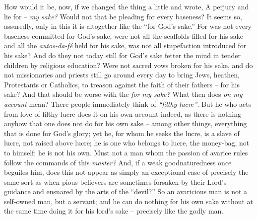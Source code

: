 How would it be, now, if we changed the thing a little and wrote, A perjury 
and lie for -- \textit{my sake?} Would not that be pleading for every 
baseness? It seems so, assuredly, only in this it is altogether like the 
``for God's sake.'' For was not every baseness committed for God's sake, 
were not all the scaffolds filled for his sake and all the 
\textit{autos-da-f\'e} held for his sake, was not all stupefaction introduced 
for his sake? And do they not today still for God's sake fetter the mind in 
tender children by religious education? Were not sacred vows broken for his 
sake, and do not missionaries and priests still go around every day to bring 
Jews, heathen, Protestants or Catholics, to treason against the faith of their 
fathers -- for his sake? And that should be worse with the \textit{for my 
sake?} What then does \textit{on my account} mean? There people immediately 
think of \textit{``filthy lucre''}. But he who acts from love of filthy 
lucre does it on his own account indeed, as there is nothing anyhow that one 
does not do for his own sake -- among other things, everything that is done 
for God's glory; yet he, for whom he seeks the lucre, is a slave of lucre, not 
raised above lucre; he is one who belongs to lucre, the money-bag, not to 
himself; he is not his own. Must not a man whom the passion of avarice rules 
follow the commands of this \textit{master?} And, if a weak goodnaturedness 
once beguiles him, does this not appear as simply an exceptional case of 
precisely the same sort as when pious believers are sometimes forsaken by 
their Lord's guidance and ensnared by the arts of the ``devil?'' So an 
avaricious man is not a self-owned man, but a servant; and he can do nothing 
for his own sake without at the same time doing it for his lord's sake -- 
precisely like the godly man.

